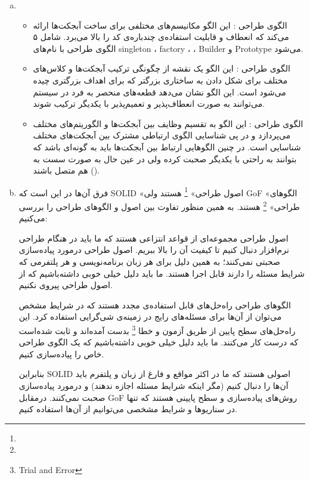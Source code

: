 {\begin{enumerate}[a)]
	\item

\begin{itemize}
	\item الگوی طراحی : این الگو مکانیسم‌های مختلفی برای ساخت آبجکت‌ها ارائه می‌کند که انعطاف و قابلیت استفاده‌ی چندباره‌ی کد را بالا می‌برد. شامل ۵ الگوی طراحی با نام‌های singleton ، factory ،  ، ‌Builder و Prototype می‌شود.
	\item الگوی طراحی : این الگو یک نقشه از چگونگی ترکیب آبجکت‌ها و کلاس‌‌های مختلف برای شکل دادن به ساختاری بزرگتر که برای اهداف بزرگتری چیده می‌شود است. این الگو نشان می‌دهد قطعه‌های منحصر به فرد در سیستم می‌توانند به صورت انعطاف‌پذیر و تعمیم‌پذیر با یکدیگر ترکیب شوند.
 	\item الگوی طراحی : این الگو به تقسیم وظایف بین آبجکت‌ها و الگوریتم‌های مختلف می‌پردازد و در پی شناسایی الگوی ارتباطی مشترک بین آبجکت‌های مختلف شناسایی است. در چنین الگوهایی ارتباط بین آبجکت‌ها باید به گونه‌ای باشد که بتوانند به راحتی با یکدیگر صحبت کرده ولی در عین حال به صورت سست به هم متصل باشند ().
\end{itemize}

 	\item
فرق آن‌ها در این است که SOLID «اصول طراحی» \footnote{} هستند ولی GoF «الگوهای طراحی» \footnote{} هستند. به همین منظور تفاوت بین اصول و الگوهای طراحی را بررسی می‌کنیم:

اصول طراحی مجموعه‌ای از قواعد انتزاعی هستند که ما باید در هنگام طراحی نرم‌افزار دنبال کنیم تا کیفیت آن را بالا ببریم. اصول طراحی درمورد پیاده‌سازی صحبتی نمی‌کنند؛ به همین دلیل برای هر زبان برنامه‌نویسی و هر پلتفرمی که شرایط مسئله را دارند قابل اجرا هستند. ما باید دلیل خیلی خوبی داشته‌باشیم که از اصول طراحی پیروی نکنیم.

الگوهای طراحی راه‌حل‌های قابل استفاده‌ی مجدد هستند که در شرایط مشخص می‌توان از آن‌ها برای مسئله‌های رایج در زمینه‌ی شی‌گرایی استفاده کرد. این راه‌حل‌های سطح پایین از طریق آزمون و خطا \footnote{Trial and Error} بدست آمده‌اند و ثابت شده‌است که درست کار می‌کنند. ما باید دلیل خیلی خوبی داشته‌باشیم که یک الگوی طراحی خاص را پیاده‌سازی کنیم.

بنابراین SOLID اصولی هستند که ما در اکثر مواقع و فارغ از زبان و پلتفرم باید آن‌ها را دنبال کنیم (مگر اینکه شرایط مسئله اجازه ندهند) و درمورد پیاده‌سازی صحبت نمی‌کنند. درمقابل GoF روش‌های پیاده‌سازی‌ و سطح پایینی هستند که تنها در سناریو‌ها و شرایط مشخصی می‌توانیم از آن‌ها استفاده کنیم.
\end{enumerate}
}
